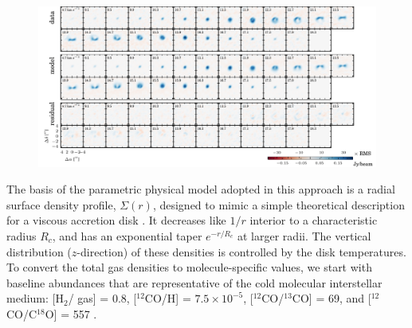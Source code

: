 \documentclass[twocolumn]{aastex61}
\begin{document}
\begin{figure}[ht!]
\begin{center}
  \includegraphics{chmaps_13CO.pdf}
  \end{center}
\end{figure}

The basis of the parametric physical model adopted in this approach is a radial surface density profile, $\Sigma(r)$, designed to mimic a simple theoretical description for a viscous accretion disk \citep{lyndenbell74,hartmann98}.  It decreases like $1/r$ interior to a characteristic radius $R_c$, and has an exponential taper $e^{-r/R_c}$ at larger radii.  The vertical distribution ($z$-direction) of these densities is controlled by the disk temperatures. To convert the total gas densities to molecule-specific values, we start with baseline abundances that are representative of the cold molecular interstellar medium: [H$_2$/ gas] = 0.8, [$^{12}$CO/H] = $7.5 \times 10^{-5}$, [$^{12}$CO/$^{13}$CO] = 69, and [$^{12}$CO/C$^{18}$O] = 557 \citep[e.g.,][]{henkel94,prantzos96}.
\end{document}
